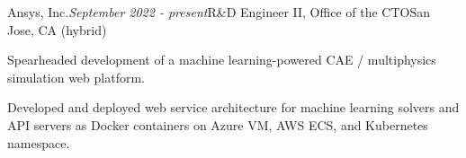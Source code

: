 \begin{rSubsection}{Ansys, Inc.}{\em September 2022 - present}{R\&D Engineer II, Office of the CTO}{San Jose, CA (hybrid)}
\item Spearheaded development of a machine learning-powered CAE / multiphysics simulation web platform.
\item Developed and deployed web service architecture for machine learning solvers and API servers as Docker containers on Azure VM, AWS ECS, and Kubernetes namespace.
\end{rSubsection}